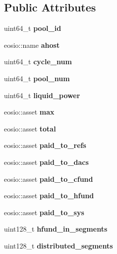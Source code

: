 \subsection*{Public Attributes}
\begin{DoxyCompactItemize}
\item 
\mbox{\label{structsincome_a09ece84fa00731047836986ca1786ef8}} 
uint64\+\_\+t {\bfseries pool\+\_\+id}
\item 
\mbox{\label{structsincome_a2d0d6337a359acf0734c96697b348f47}} 
eosio\+::name {\bfseries ahost}
\item 
\mbox{\label{structsincome_a876a7e7ebf08639f7ad88e67fb04b71d}} 
uint64\+\_\+t {\bfseries cycle\+\_\+num}
\item 
\mbox{\label{structsincome_acb00f29572d26e42f130437d68d818b6}} 
uint64\+\_\+t {\bfseries pool\+\_\+num}
\item 
\mbox{\label{structsincome_a2273801c23b8d1d29bfe4993c545310c}} 
uint64\+\_\+t {\bfseries liquid\+\_\+power}
\item 
\mbox{\label{structsincome_a235cda95c9ef83298fc9a7aeccc54446}} 
eosio\+::asset {\bfseries max}
\item 
\mbox{\label{structsincome_ae55609215cedb51a2c9e76fb32c79d58}} 
eosio\+::asset {\bfseries total}
\item 
\mbox{\label{structsincome_add329640eaf3fc690232466e75cb8671}} 
eosio\+::asset {\bfseries paid\+\_\+to\+\_\+refs}
\item 
\mbox{\label{structsincome_a422ee3f187ebb2f8bdc9498b424179da}} 
eosio\+::asset {\bfseries paid\+\_\+to\+\_\+dacs}
\item 
\mbox{\label{structsincome_af28f3d60a447ccebbf167ed976f78f89}} 
eosio\+::asset {\bfseries paid\+\_\+to\+\_\+cfund}
\item 
\mbox{\label{structsincome_a2f295c491b230cf0fba00f94478df106}} 
eosio\+::asset {\bfseries paid\+\_\+to\+\_\+hfund}
\item 
\mbox{\label{structsincome_a6ac53154170813103756183c5d74e86b}} 
eosio\+::asset {\bfseries paid\+\_\+to\+\_\+sys}
\item 
\mbox{\label{structsincome_a4092658b524a05c672fa7411bfcf8b24}} 
uint128\+\_\+t {\bfseries hfund\+\_\+in\+\_\+segments}
\item 
\mbox{\label{structsincome_a34153b6476a8efdb0e2edf8ff7890628}} 
uint128\+\_\+t {\bfseries distributed\+\_\+segments}
\end{DoxyCompactItemize}



